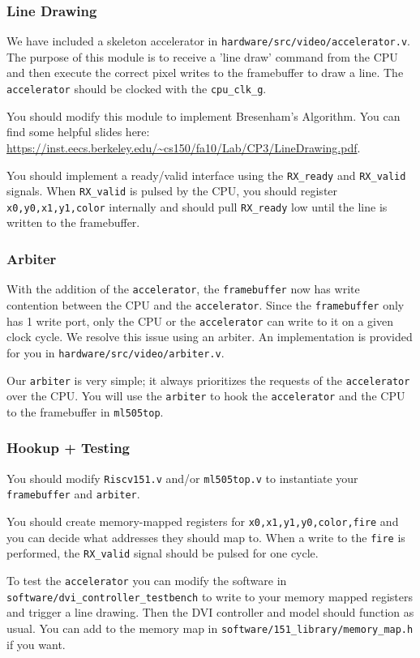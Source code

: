 \documentclass[11pt]{article}
\begin{document}
\subsubsection{Line Drawing}
We have included a skeleton accelerator in \verb|hardware/src/video/accelerator.v|. The purpose of this module is to receive a 'line draw' command from the CPU and then execute the correct pixel writes to the framebuffer to draw a line. The \verb|accelerator| should be clocked with the \verb|cpu_clk_g|.

You should modify this module to implement Bresenham's Algorithm. You can find some helpful slides here: \url{https://inst.eecs.berkeley.edu/~cs150/fa10/Lab/CP3/LineDrawing.pdf}. 

You should implement a ready/valid interface using the \verb|RX_ready| and \verb|RX_valid| signals. When \verb|RX_valid| is pulsed by the CPU, you should register \verb|x0,y0,x1,y1,color| internally and should pull \verb|RX_ready| low until the line is written to the framebuffer.

\subsubsection{Arbiter}
With the addition of the \verb|accelerator|, the \verb|framebuffer| now has write contention between the CPU and the \verb|accelerator|. Since the \verb|framebuffer| only has 1 write port, only the CPU or the \verb|accelerator| can write to it on a given clock cycle. We resolve this issue using an arbiter. An implementation is provided for you in \verb|hardware/src/video/arbiter.v|.

Our \verb|arbiter| is very simple; it always prioritizes the requests of the \verb|accelerator| over the CPU. You will use the \verb|arbiter| to hook the \verb|accelerator| and the CPU to the framebuffer in \verb|ml505top|.

\subsubsection{Hookup + Testing}
You should modify \verb|Riscv151.v| and/or \verb|ml505top.v| to instantiate your \verb|framebuffer| and \verb|arbiter|.

You should create memory-mapped registers for \verb|x0,x1,y1,y0,color,fire| and you can decide what addresses they should map to. When a write to the \verb|fire| is performed, the \verb|RX_valid| signal should be pulsed for one cycle.

To test the \verb|accelerator| you can modify the software in \verb|software/dvi_controller_testbench| to write to your memory mapped registers and trigger a line drawing. Then the DVI controller and model should function as usual. You can add to the memory map in \verb|software/151_library/memory_map.h| if you want.
\end{document}

